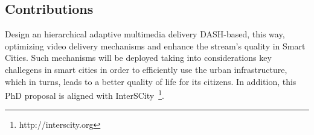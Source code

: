 \subsection*{Contributions}
\label{sec:contributions}




Design an hierarchical adaptive multimedia delivery DASH-based, this way, optimizing video delivery mechanisms and enhance the stream's quality in Smart Cities. Such mechanisms will be deployed taking into considerations key challegens in smart cities in order to efficiently use the urban infrastructure, which in turns, leads to a better quality of life for its citizens.
In addition, this PhD proposal is aligned with InterSCity~\footnote{http://interscity.org}.

%
%


